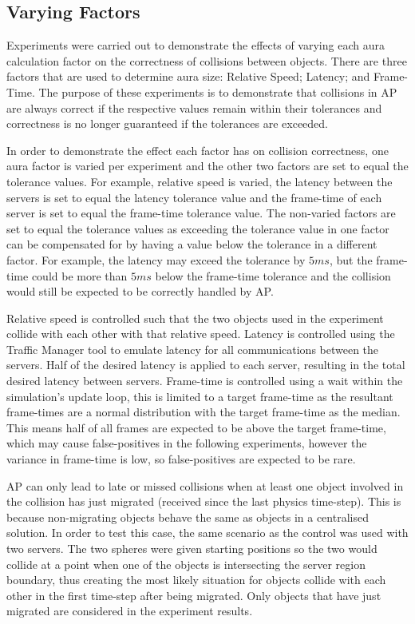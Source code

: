 \subsection{Varying Factors}

Experiments were carried out to demonstrate the effects of varying each aura calculation factor on the correctness of collisions between objects. There are three factors that are used to determine aura size: Relative Speed; Latency; and Frame-Time. The purpose of these experiments is to demonstrate that collisions in AP are always correct if the respective values remain within their tolerances and correctness is no longer guaranteed if the tolerances are exceeded. 

In order to demonstrate the effect each factor has on collision correctness, one aura factor is varied per experiment and the other two factors are set to equal the tolerance values. For example, relative speed is varied, the latency between the servers is set to equal the latency tolerance value and the frame-time of each server is set to equal the frame-time tolerance value. The non-varied factors are set to equal the tolerance values as exceeding the tolerance value in one factor can be compensated for by having a value below the tolerance in a different factor. For example, the latency may exceed the tolerance by $5ms$, but the frame-time could be more than $5ms$ below the frame-time tolerance and the collision would still be expected to be correctly handled by AP.

Relative speed is controlled such that the two objects used in the experiment collide with each other with that relative speed. Latency is controlled using the Traffic Manager tool to emulate latency for all communications between the servers. Half of the desired latency is applied to each server, resulting in the total desired latency between servers.
Frame-time is controlled using a wait within the simulation's update loop, this is limited to a target frame-time as the resultant frame-times are a normal distribution with the target frame-time as the median. This means half of all frames are expected to be above the target frame-time, which may cause false-positives in the following experiments, however the variance in frame-time is low, so false-positives are expected to be rare.

AP can only lead to late or missed collisions when at least one object involved in the collision has just migrated (received since the last physics time-step). This is because non-migrating objects behave the same as objects in a centralised solution. In order to test this case, the same scenario as the control was used with two servers. The two spheres were given starting positions so the two would collide at a point when one of the objects is intersecting the server region boundary, thus creating the most likely situation for objects collide with each other in the first time-step after being migrated. Only objects that have just migrated are considered in the experiment results. 

